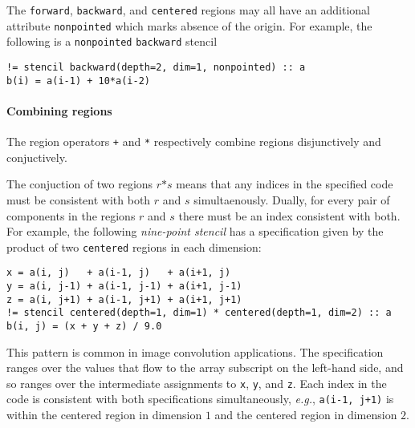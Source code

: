 \documentclass[10pt,preprint,numbers]{sigplanconf}
\theoremstyle{definition}
\newcommand{\eg}{\emph{e.g.}}
\newcommand{\term}[1]{\texttt{#1}}
\begin{document}
The \term{forward}, \term{backward}, and \term{centered} regions may
all have an additional attribute \term{nonpointed} which marks absence
of the origin.  For example, the following is a
\term{nonpointed} \term{backward} stencil
%
\begin{verbatim}
!= stencil backward(depth=2, dim=1, nonpointed) :: a
b(i) = a(i-1) + 10*a(i-2)
\end{verbatim}

\paragraph{Combining regions}




%

The region operators \term{+} and \term{*} respectively combine
regions disjunctively and conjuctively.

The conjuction of two regions $r \term{*} s$ means that any indices
in the specified code must be consistent with both $r$ and $s$
simultaenously. Dually, for every pair of components in the regions
$r$ and $s$ there must be an index consistent with both.
For example, the following \emph{nine-point stencil}
has a specification given by the product of two \texttt{centered}
regions in each dimension:
\begin{verbatim}
x = a(i, j)   + a(i-1, j)   + a(i+1, j)
y = a(i, j-1) + a(i-1, j-1) + a(i+1, j-1)
z = a(i, j+1) + a(i-1, j+1) + a(i+1, j+1)
!= stencil centered(depth=1, dim=1) * centered(depth=1, dim=2) :: a
b(i, j) = (x + y + z) / 9.0
\end{verbatim}
This pattern is common in image convolution applications.
The specification ranges over the
values that flow to the array subscript on the left-hand side,
and so ranges over the intermediate assignments to \term{x},
\term{y}, and \term{z}. Each index in the code is consistent
with both specifications simultaneously, \eg{}, \texttt{a(i-1, j+1)}
is within the centered region in dimension $1$ and the centered region
in dimension $2$.
\end{document}
